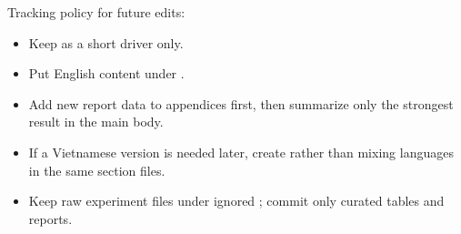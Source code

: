 Tracking policy for future edits:

\begin{itemize}[leftmargin=*]
  \item Keep  as a short driver only.
  \item Put English content under .
  \item Add new report data to appendices first, then summarize only the strongest result in the main body.
  \item If a Vietnamese version is needed later, create  rather than mixing languages in the same section files.
  \item Keep raw experiment files under ignored ; commit only curated tables and reports.
\end{itemize}

